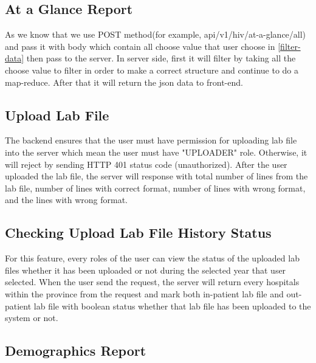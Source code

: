         \subsection{At a Glance Report}\label{at_a_glance_report_back_end}
            As we know that we use POST method(for example, api/v1/hiv/at-a-glance/all) and pass it with body which contain all choose value that user choose in \ref{filter-data} then pass to the server. In server side, first it will filter by taking all the choose value to filter in order to make a correct structure and continue to do a map-reduce. After that it will return the json data to front-end.
            
        
        \subsection{Upload Lab File} \label{upload_file_back_end}
            The backend ensures that the user must have permission for uploading lab file into the server which mean the user must have "UPLOADER" role. Otherwise, it will reject by sending HTTP 401 status code (unauthorized). After the user uploaded the lab file, the server will response with total number of lines from the lab file, number of lines with correct format, number of lines with wrong format, and the lines with wrong format.
        
        \subsection{Checking Upload Lab File History Status }         \label{check_upload_history_status_ui_back_end}
            For this feature, every roles of the user can view the status of the uploaded lab files whether it has been uploaded or not during the selected year that user selected. When the user send the request, the server will return every hospitals within the province from the request and mark both in-patient lab file and out-patient lab file with boolean status whether that lab file has been uploaded to the system or not.
            
        
        \subsection{Demographics Report} \label{demographics_report_back_end}
            

